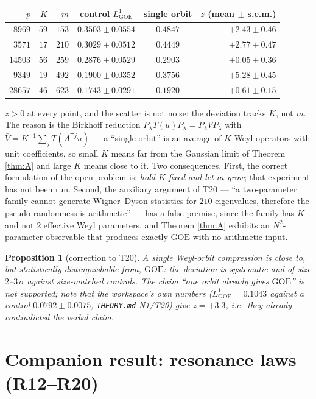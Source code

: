 \documentclass[11pt,reqno]{amsart}
\newtheorem{proposition}[theorem]{Proposition}
\theoremstyle{definition}
\newcommand{\GOE}{\mathrm{GOE}}
\begin{document}
\begin{center}\small
\begin{tabular}{rrrccr}
\toprule
$p$ & $K$ & $m$ & control $L^1_{\GOE}$ & single orbit & $z$ (mean $\pm$ s.e.m.)\\
\midrule
$8969$  & $59$ & $153$ & $0.3503\pm0.0554$ & $0.4847$ & $+2.43\pm0.46$\\
$3571$  & $17$ & $210$ & $0.3029\pm0.0512$ & $0.4449$ & $+2.77\pm0.47$\\
$14503$ & $56$ & $259$ & $0.2876\pm0.0529$ & $0.2903$ & $+0.05\pm0.36$\\
$9349$  & $19$ & $492$ & $0.1900\pm0.0352$ & $0.3756$ & $+5.28\pm0.45$\\
$28657$ & $46$ & $623$ & $0.1743\pm0.0291$ & $0.1920$ & $+0.61\pm0.15$\\
\bottomrule
\end{tabular}
\end{center}

\noindent
$z>0$ at every point, and the scatter is not noise: the deviation tracks $K$, not
$m$. The reason is the Birkhoff reduction $P_\lambda T(u)P_\lambda=P_\lambda
\bar VP_\lambda$ with $\bar V=K^{-1}\sum_jT(A^{\mathsf T j}u)$ --- a ``single
orbit'' is an average of $K$ Weyl operators with unit coefficients, so small $K$
means far from the Gaussian limit of Theorem \ref{thm:A} and large $K$ means close
to it. Two consequences. First, the correct formulation of the open problem is:
\emph{hold $K$ fixed and let $m$ grow}; that experiment has not been run. Second,
the auxiliary argument of T20 --- ``a two-parameter family cannot generate
Wigner--Dyson statistics for $210$ eigenvalues, therefore the pseudo-randomness is
arithmetic'' --- has a false premise, since the family has $K$ and not $2$
effective Weyl parameters, and Theorem \ref{thm:A} exhibits an $N^2$-parameter
observable that produces exactly $\GOE$ with no arithmetic input.

\begin{proposition}[correction to T20]
A single Weyl-orbit compression is close to, but statistically distinguishable
from, $\GOE$: the deviation is systematic and of size $2$--$3\,\sigma$ against
size-matched controls. The claim ``one orbit already gives $\GOE$'' is not
supported; note that the workspace's own numbers ($L^1_{\GOE}=0.1043$ against a
control $0.0792\pm0.0075$, \texttt{THEORY.md} N1/T20) give $z=+3.3$, i.e.\ they
already contradicted the verbal claim.
\end{proposition}


\section{Companion result: resonance laws (R12--R20)}\label{sec:companion}
\end{document}
